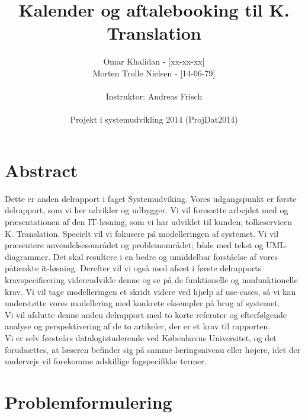 \documentclass[12pt]{article}   %
\title{Kalender og aftalebooking til K. Translation}
\author{Omar Khalidan - [xx-xx-xx]\\
     Morten Trolle Nielsen - [14-06-79]\\ \\
    Instruktor: Andreas Frisch\\ \\
Projekt i systemudvikling 2014 (ProjDat2014)}
\begin{document}
\maketitle
\thispagestyle{empty}
\newpage
\tableofcontents
\newpage

\section{Abstract}
Dette er anden delrapport i faget Systemudviking. Vores udgangspunkt er første
delrapport, som vi her udvikler og udbygger. Vi vil foresætte arbejdet med og
præsentationen af den IT-løsning, som vi har udviklet til kunden; tolkeservicen
K. Translation. Specielt vil vi fokusere på modelleringen af systemet. Vi vil 
præsentere anvendelsesområdet og problemområdet; både med tekst og UML-diagrammer.
Det skal resultere i en bedre og umiddelbar forståelse af vores påtænkte it-løsning.
Derefter vil vi også med afsæt i første delrapports kravspecificering videreudvikle
denne og se på de funktionelle og nonfunktionelle krav. Vi vil tage modelleringen
et skridt videre ved hjælp af use-cases, så vi kan understøtte vores modellering med
konkrete eksempler på brug af systemet. \\
Vi vil afslutte denne anden delrapport med to korte referater og efterfølgende
analyse og perspektivering af de to artikeler, der er et krav til rapporten.\\
Vi er selv førsteårs datalogistuderende ved Københavns Universitet, og det
forudsættes, at læseren befinder sig på samme læringsniveau eller højere, idet
der undervejs vil forekomme adskillige fagspecifikke termer. 

\newpage

\section{Problemformulering}
\end{document}
